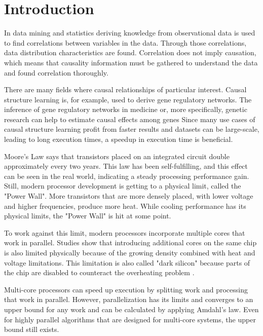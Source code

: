 \chapter{Introduction}
In data mining and statistics deriving knowledge from observational data is used to find correlations between variables in the data. Through those correlations, data distribution characteristics are found. Correlation does not imply causation, which means that causality information must be gathered to understand the data and found correlation thoroughly. 

There are many fields where causal relationships of particular interest. Causal structure learning is, for example, used to derive gene regulatory networks. The inference of gene regulatory networks in medicine or, more specifically, genetic research can help to estimate causal effects among genes \cite{rauJointEstimationCausal2013}
Since many use cases of causal structure learning profit from faster results and datasets can be large-scale, leading to long execution times, a speedup in execution time is beneficial.

Moore's Law \cite{mooreCrammingMoreComponents1965} says that transistors placed on an integrated circuit double approximately every two years. This law has been self-fulfilling, and this effect can be seen in the real world, indicating a steady processing performance gain. Still, modern processor development is getting to a physical limit, called the "Power Wall". More transistors that are more densely placed, with lower voltage and higher frequencies, produce more heat. While cooling performance has its physical limits, the "Power Wall" is hit at some point.

To work against this limit, modern processors incorporate multiple cores that work in parallel. Studies show that introducing additional cores on the same chip is also limited physically because of the growing density combined with heat and voltage limitations. This limitation is also called "dark silicon" because parts of the chip are disabled to counteract the overheating problem \cite{esmaeilzadehDarkSiliconEnd2011}.

Multi-core processors can speed up execution by splitting work and processing that work in parallel. However, parallelization has its limits and converges to an upper bound for any work and can be calculated by applying Amdahl's law\cite{amdahlValiditySingleProcessor1967}. Even for highly parallel algorithms that are designed for multi-core systems, the upper bound still exists.

